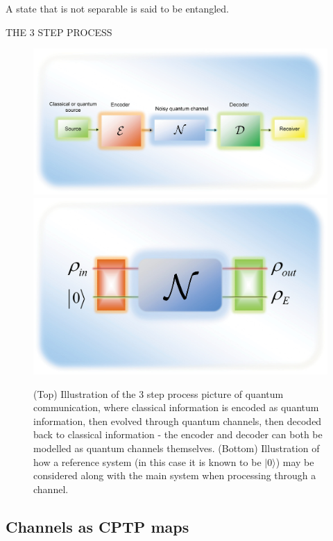 \begin{definition}[Entanglement]
    A state that is not separable is said to be entangled.
\end{definition}

THE 3 STEP PROCESS
\begin{figure}
    \centering
    \includegraphics[scale=0.15]{figures/channel1.png}
    \includegraphics[scale=0.12]{figures/channel2.png}
    \caption{(Top) Illustration of the 3 step process picture of quantum communication, where classical
    information is encoded as quantum information, then evolved through quantum channels, then decoded
    back to classical information - the encoder and decoder can both be modelled as quantum channels
    themselves. (Bottom) Illustration of how a reference system (in this case it is known to be $|0\rangle$)
    may be considered along with the main system when processing through a channel.}
\end{figure}

\subsection{Channels as CPTP maps}

